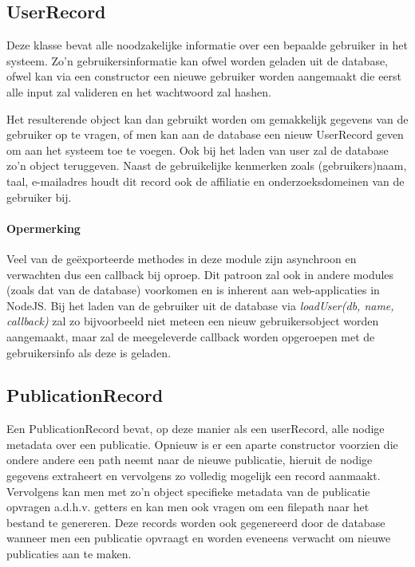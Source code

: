\documentclass{article}
\begin{document}
\subsection{UserRecord}

Deze klasse bevat alle noodzakelijke informatie over een bepaalde gebruiker in het systeem. Zo'n gebruikersinformatie kan ofwel worden geladen uit de database, ofwel kan via een constructor een nieuwe gebruiker worden aangemaakt die eerst alle input zal valideren en het wachtwoord zal hashen.

Het resulterende object kan dan gebruikt worden om gemakkelijk gegevens van de gebruiker op te vragen, of men kan aan de database een nieuw UserRecord geven om aan het systeem toe te voegen. Ook bij het laden van user zal de database zo'n object teruggeven. Naast de gebruikelijke kenmerken zoals (gebruikers)naam, taal, e-mailadres houdt dit record ook de affiliatie en onderzoeksdomeinen van de gebruiker bij.

\paragraph{Opermerking}
Veel van de ge\"exporteerde methodes in deze module zijn asynchroon en verwachten dus een callback bij oproep. Dit patroon zal ook in andere modules (zoals dat van de database) voorkomen en is inherent aan web-applicaties in NodeJS. Bij het laden van de gebruiker uit de database via \textit{loadUser(db, name, callback)} zal zo bijvoorbeeld niet meteen een nieuw gebruikersobject worden aangemaakt, maar zal de meegeleverde callback worden opgeroepen met de gebruikersinfo als deze is geladen. 

\subsection{PublicationRecord}

Een PublicationRecord bevat, op deze manier als een userRecord, alle nodige metadata over een publicatie. Opnieuw is er een aparte constructor voorzien die ondere andere een path neemt naar de nieuwe publicatie, hieruit de nodige gegevens extraheert en vervolgens zo volledig mogelijk een record aanmaakt. \\

Vervolgens kan men met zo'n object specifieke metadata van de publicatie opvragen a.d.h.v. getters en kan men ook vragen om een filepath naar het bestand te genereren. Deze records worden ook gegenereerd door de database wanneer men een publicatie opvraagt en worden eveneens verwacht om nieuwe publicaties aan te maken.
\end{document}
